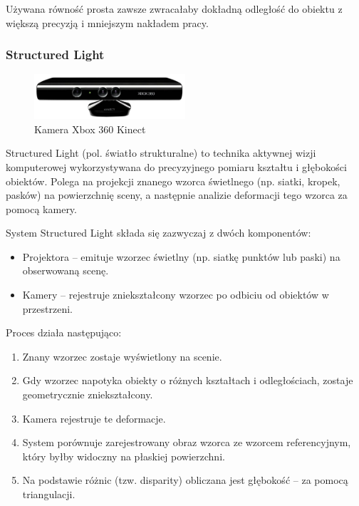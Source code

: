 \documentclass[magisterska]{pracadypl}
\begin{document}
Używana równość prosta zawsze zwracałaby dokładną odległość do obiektu z większą precyzją i mniejszym nakładem pracy.

\subsubsection*{Structured Light}

\begin{figure}[H]  %
    \centering  %
    \includegraphics[width=0.5\textwidth]{images/POINTCLOUD.png}  %
    \captionsetup{font=footnotesize}
    \caption[Kamera Xbox 360 Kinect. https://cell-kom.com/inne/21454-kamera-internetowa-full-hd-b16-1080p-5900217390350.html]{Kamera Xbox 360 Kinect}
    \label{fig:kinect}  %
\end{figure}

Structured Light (pol. światło strukturalne) to technika aktywnej wizji komputerowej wykorzystywana do precyzyjnego pomiaru kształtu i głębokości obiektów. Polega na projekcji znanego wzorca świetlnego (np. siatki, kropek, pasków) na powierzchnię sceny, a następnie analizie deformacji tego wzorca za pomocą kamery.

\bigskip

System Structured Light składa się zazwyczaj z dwóch komponentów:

\begin{itemize}
  \item Projektora – emituje wzorzec świetlny (np. siatkę punktów lub paski) na obserwowaną scenę.

  \item Kamery – rejestruje zniekształcony wzorzec po odbiciu od obiektów w przestrzeni.
\end{itemize}

Proces działa następująco:

\begin{enumerate}
  \item Znany wzorzec zostaje wyświetlony na scenie.

  \item Gdy wzorzec napotyka obiekty o różnych kształtach i odległościach, zostaje geometrycznie zniekształcony.

  \item Kamera rejestruje te deformacje.

  \item System porównuje zarejestrowany obraz wzorca ze wzorcem referencyjnym, który byłby widoczny na płaskiej powierzchni.

  \item Na podstawie różnic (tzw. disparity) obliczana jest głębokość – za pomocą triangulacji.
\end{enumerate}
\end{document}
